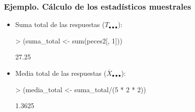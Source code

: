 \begin{frame}[fragile]
\frametitle{Ejemplo. Cálculo de los estadísticos muestrales}
\begin{itemize}
\item<2-> Suma total de las respuestas ($T_{\bullet\bullet\bullet}$):
\begin{Schunk}
\begin{Sinput}
> (suma_total <- sum(peces2[, 1]))
\end{Sinput}
\begin{Soutput}
[1] 27.25
\end{Soutput}
\end{Schunk}
\item<3-> Media total de las respuestas ($\overline{X}_{\bullet\bullet\bullet}$):
\begin{Schunk}
\begin{Sinput}
> (media_total <- suma_total/(5 * 2 * 2))
\end{Sinput}
\begin{Soutput}
[1] 1.3625
\end{Soutput}
\end{Schunk}
\end{itemize}
\end{frame}



